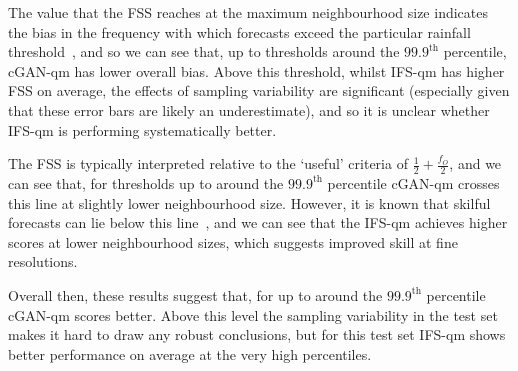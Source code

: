 \documentclass{article}
\begin{document}
The value that the FSS reaches at the maximum neighbourhood size indicates the bias in the frequency with which forecasts exceed the particular rainfall threshold~\citep{roberts_assessing_2008, roberts_scale-selective_2008}, and so we can see that, up to thresholds around the $99.9^{\text{th}}$ percentile, cGAN-qm has lower overall bias. Above this threshold, whilst IFS-qm has higher FSS on average, the effects of sampling variability are significant (especially given that these error bars are likely an underestimate), and so it is unclear whether IFS-qm is performing systematically better. 

The FSS is typically interpreted relative to the `useful' criteria of $\frac{1}{2} + \frac{f_O}{2}$, and we can see that, for thresholds up to around the $99.9^{\text{th}}$ percentile cGAN-qm crosses this line at slightly lower neighbourhood size. However, it is known that skilful forecasts can lie below this line~\citep{nachamkin_applying_2015, mittermaier_long-term_2013}, and we can see that the IFS-qm achieves higher scores at lower neighbourhood sizes, which suggests improved skill at fine resolutions. 

Overall then, these results suggest that, for up to around the $99.9^{\text{th}}$ percentile cGAN-qm scores better. Above this level the sampling variability in the test set makes it hard to draw any robust conclusions, but for this test set IFS-qm shows better performance on average at the very high percentiles.
\end{document}
